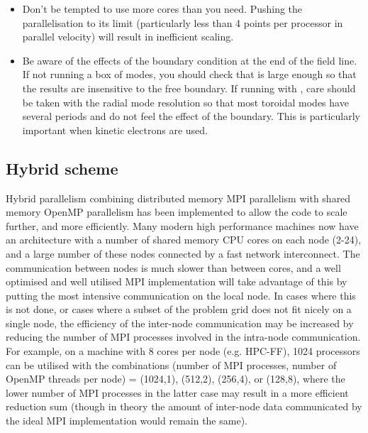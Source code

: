 \begin{itemize}
\item Don't be tempted to use more cores than you need.  Pushing the parallelisation to its limit 
       (particularly less than 4 points per processor in parallel velocity) will result in inefficient scaling.

\item Be aware of the effects of the boundary condition at the end of the field line. If not running a box of modes, you should
       check that  is large enough so that the results are insensitive to the free boundary. If running with
       , care should be taken with the radial mode resolution so that most toroidal modes have several periods and
       do not feel the effect of the boundary. This is particularly important when kinetic electrons are used.

\end{itemize}

\subsection{Hybrid scheme \label{sec:hybrid}}

Hybrid parallelism combining distributed memory MPI parallelism with shared memory OpenMP parallelism
has been implemented to allow the code to scale further, and more efficiently. 
Many modern high performance machines now have an architecture with a number of shared memory CPU cores on each node (2-24), 
and a large number of these nodes connected by a fast network interconnect.  
The communication between nodes is much slower than between cores, and a well optimised and well
utilised MPI implementation will take advantage of this by putting the most intensive communication on the local node.
  In cases where this is not done, or cases where a subset of 
the problem grid does not fit nicely on a single node, the efficiency of the inter-node communication may be increased by reducing 
the number of MPI processes involved in the intra-node communication.  For example, on a machine with 8 cores per node (e.g. HPC-FF), 
1024  processors can be utilised with the combinations 
(number of MPI processes, number of OpenMP threads per node) = (1024,1), (512,2), (256,4), or (128,8), 
where the lower number of MPI processes in the latter case may result in a more efficient reduction sum 
(though in theory the amount of inter-node data communicated by the ideal MPI implementation would remain the same).

